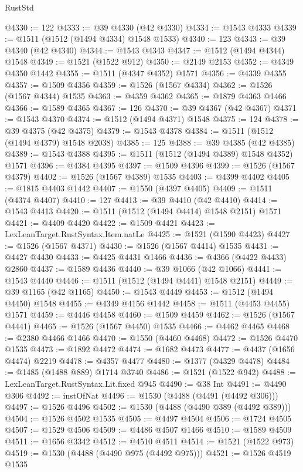 \begin{lexlean}{RustStd}
\begin{coremodule}
{\begin{coremodule}
{{{{{{{{{{{{{{{{{{{{{{{{{{{{{{{{{{{@4330 := 122
@4333 := @39 @4330 (@42 @4330)
@4334 := @1543 @4333
@4339 := @1511 (@1512 (@1494 @4334) @1548 @1533)
@4340 := 123
@4343 := @39 @4340 (@42 @4340)
@4344 := @1543 @4343
@4347 := @1512 (@1494 @4344) @1548
@4349 := @1521 (@1522 @912)
@4350 := @2149 @2153
@4352 := @4349 @4350 @1442
@4355 := @1511 (@4347 @4352) @1571
@4356 := @4339 @4355
@4357 := @1509 @4356
@4359 := @1526 (@1567 @4334)
@4362 := @1526 (@1567 @4344) @1535
@4363 := @4359 @4362
@4365 := @1879 @4363 @1466
@4366 := @1589 @4365
@4367 := 126
@4370 := @39 @4367 (@42 @4367)
@4371 := @1543 @4370
@4374 := @1512 (@1494 @4371) @1548
@4375 := 124
@4378 := @39 @4375 (@42 @4375)
@4379 := @1543 @4378
@4384 := @1511 (@1512 (@1494 @4379) @1548 @2038)
@4385 := 125
@4388 := @39 @4385 (@42 @4385)
@4389 := @1543 @4388
@4395 := @1511 (@1512 (@1494 @4389) @1548 @4352) @1571
@4396 := @4384 @4395
@4397 := @1509 @4396
@4399 := @1526 (@1567 @4379)
@4402 := @1526 (@1567 @4389) @1535
@4403 := @4399 @4402
@4405 := @1815 @4403 @1442
@4407 := @1550 (@4397 @4405)
@4409 := @1511 (@4374 @4407)
@4410 := 127
@4413 := @39 @4410 (@42 @4410)
@4414 := @1543 @4413
@4420 := @1511 (@1512 (@1494 @4414) @1548 @2151) @1571
@4421 := @4409 @4420
@4422 := @1509 @4421
@4423 := LexLeanTarget.RustSyntax.Item.natLe
@4425 := @1521 (@1590 @4423)
@4427 := @1526 (@1567 @4371)
@4430 := @1526 (@1567 @4414) @1535
@4431 := @4427 @4430
@4433 := @4425 @4431 @1466
@4436 := @4366 (@4422 @4433) @2860
@4437 := @1589 @4436
@4440 := @39 @1066 (@42 @1066)
@4441 := @1543 @4440
@4446 := @1511 (@1512 (@1494 @4441) @1548 @2151)
@4449 := @39 @1165 (@42 @1165)
@4450 := @1543 @4449
@4453 := @1512 (@1494 @4450) @1548
@4455 := @4349 @4156 @1442
@4458 := @1511 (@4453 @4455) @1571
@4459 := @4446 @4458
@4460 := @1509 @4459
@4462 := @1526 (@1567 @4441)
@4465 := @1526 (@1567 @4450) @1535
@4466 := @4462 @4465
@4468 := @2380 @4466 @1466
@4470 := @1550 (@4460 @4468)
@4472 := @1526 @4470 @1535
@4473 := @1892 @4472
@4474 := @1682 @4473
@4477 := @4437 (@1656 @4474) @2219
@4478 := @4357 @4477
@4480 := @1377 (@4329 @4478)
@4484 := @1485 (@1488 @889) @1714 @3740
@4486 := @1521 (@1522 @942)
@4488 := LexLeanTarget.RustSyntax.Lit.fixed @945
@4490 := @38 Int
@4491 := @4490 @306
@4492 := instOfNat
@4496 := @1530 (@4488 (@4491 (@4492 @306)))
@4497 := @1526 @4496
@4502 := @1530 (@4488 (@4490 @389 (@4492 @389)))
@4504 := @1526 @4502 @1535
@4505 := @4497 @4504
@4506 := @1724 @4505
@4507 := @1529 @4506
@4509 := @4486 @4507 @1466
@4510 := @1589 @4509
@4511 := @1656 @3342
@4512 := @4510 @4511
@4514 := @1521 (@1522 @973)
@4519 := @1530 (@4488 (@4490 @975 (@4492 @975)))
@4521 := @1526 @4519 @1535
}}}}}}}}}}}}}}}}}}}}}}}}}}}}}}}}}}}
\end{coremodule}}
\end{coremodule}
\end{lexlean}
